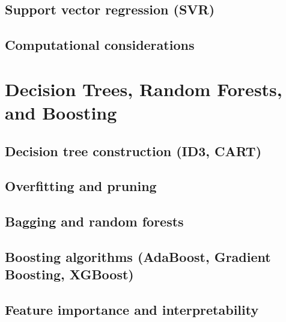 \subsection{Support vector regression (SVR)}
\subsection{Computational considerations}

\section{Decision Trees, Random Forests, and Boosting}
\subsection{Decision tree construction (ID3, CART)}
\subsection{Overfitting and pruning}
\subsection{Bagging and random forests}
\subsection{Boosting algorithms (AdaBoost, Gradient Boosting, XGBoost)}
\subsection{Feature importance and interpretability}